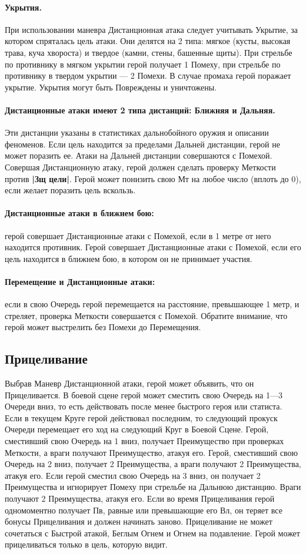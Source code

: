 \paragraph{Укрытия.} При использовании маневра Дистанционная атака следует учитывать Укрытие, за котором спряталась цель атаки. Они делятся на 2 типа: мягкое (кусты, высокая трава, куча хвороста) и твердое (камни, стены, башенные щиты). При стрельбе по противнику в мягком укрытии герой получает 1 Помеху, при стрельбе по противнику в твердом укрытии — 2 Помехи. В случае промаха герой поражает укрытие. Укрытия могут быть Повреждены и уничтожены.
\paragraph{Дистанционные атаки имеют 2 типа дистанций: Ближняя и Дальняя.} Эти дистанции указаны в статистиках дальнобойного оружия и описании феноменов. Если цель находится за пределами Дальней дистанции, герой не может поразить ее. Атаки на Дальней дистанции совершаются с Помехой. Совершая Дистанционную атаку, герой должен сделать проверку Меткости против \textbf{|Зщ цели|}. Герой может понизить свою Мт на любое число (вплоть до 0), если желает поразить цель вскользь.
\paragraph{Дистанционные атаки в ближнем бою:} герой совершает Дистанционные атаки с Помехой, если в 1 метре от него находится противник. Герой совершает Дистанционные атаки с Помехой, если его цель находится в ближнем бою, в котором он не принимает участия.
\paragraph{Перемещение и Дистанционные атаки:} если в свою Очередь герой перемещается на расстояние, превышающее 1 метр, и стреляет, проверка Меткости совершается с Помехой. Обратите внимание, что герой может выстрелить без Помехи до Перемещения.
\subsection{Прицеливание}
Выбрав Маневр Дистанционной атаки, герой может объявить, что он Прицеливается. В боевой сцене герой может сместить свою Очередь на 1—3 Очереди вниз, то есть действовать после менее быстрого героя или статиста. Если в текущем Круге герой действовал последним, то следующий прокуск Очереди перемещает его ход на следующий Круг в Боевой Сцене. Герой, сместивший свою Очередь на 1 вниз, получает Преимущество при проверках Меткости, а враги получают Преимущество, атакуя его. Герой, сместивший свою Очередь на 2 вниз, получает 2 Преимущества, а враги получают 2 Преимущества, атакуя его. Если герой сместил свою Очередь на 3 вниз, он получает 2 Преимущества и игнорирует Помеху при стрельбе на Дальнюю дистанцию. Враги получают 2 Преимущества, атакуя его.
\newline
Если во время Прицеливания герой одномоментно получает Пв, равные или превышающие его Вл, он теряет все бонусы Прицеливания и должен начинать заново. Прицеливание не может сочетаться с Быстрой атакой, Беглым Огнем и Огнем на подавление. Герой может прицеливаться только в цель, которую видит.
